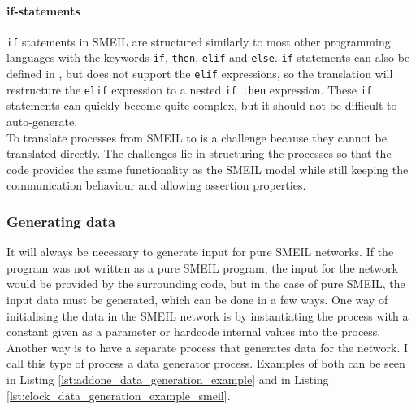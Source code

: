 \paragraph{if-statements}
\texttt{if} statements in SMEIL are structured similarly to most other programming languages with the keywords \texttt{if}, \texttt{then}, \texttt{elif} and \texttt{else}. \texttt{if} statements can also be defined in \cspm, but \cspm{} does not support the \texttt{elif} expressions, so the translation will restructure the \texttt{elif} expression to a nested \texttt{if then} expression. These \texttt{if} statements can quickly become quite complex, but it should not be difficult to auto-generate.\\

To translate processes from SMEIL to \cspm{} is a challenge because they cannot be translated directly. The challenges lie in structuring the \cspm{} processes so that the \cspm{} code provides the same functionality as the SMEIL model while still keeping the \cspm{} communication behaviour and allowing assertion properties.
\subsubsection{Generating data}
It will always be necessary to generate input for pure SMEIL networks. If the program was not written as a pure SMEIL program, the input for the network would be provided by the surrounding code, but in the case of pure SMEIL, the input data must be generated, which can be done in a few ways.
One way of initialising the data in the SMEIL network is by instantiating the process with a constant given as a parameter or hardcode internal values into the process. Another way is to have a separate process that generates data for the network. I call this type of process a data generator process. Examples of both can be seen in Listing \ref{lst:addone_data_generation_example} and in Listing \ref{lst:clock_data_generation_example_smeil}.\\

